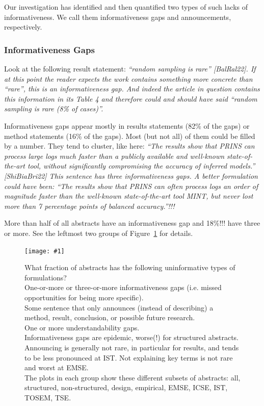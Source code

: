 \documentclass[10pt,journal,compsoc]{IEEEtran}
\newcommand{\Plotwide}[2]{%
	\begin{figure}[tbp]%
		\centering\texttt{[image: \#1]}%
		\vspace{-4mm}\caption{#2}\label{#1}%
    \end{figure}}
\newcommand{\Art}[1]{\bgroup[#1]\egroup} %
\newcommand{\Quote}[1]{\bgroup\itshape ``#1''\egroup}  %
\newcommand{\Pseudoquote}[1]{\bgroup\itshape ``#1''\egroup}  %
\newcommand{\Describegroups}{The plots in each group show these different subsets of abstracts:
	all, structured, non-structured, design, empirical, EMSE, ICSE, IST, TOSEM, TSE.}
\begin{document}
Our investigation has identified and then quantified two types
of such lacks of informativeness.
We call them informativeness gaps and announcements, respectively.

\subsubsection{Informativeness Gaps}\label{igaps}

Look at the following result statement:
\Quote{random sampling is rare} \Art{BalRal22}. %
If at this point the reader expects the work contains something more
concrete than \Quote{rare}, this is an informativeness gap.
And indeed the article in question contains this information in its
Table 4 and therefore could and should have said
\Pseudoquote{random sampling is rare (8\% of cases)}.

Informativeness gaps appear mostly in results statements (82\% of the gaps)
or method statements (16\% of the gaps).
Most (but not all) of them could be filled by a number.
They tend to cluster,
like here:
\Quote{The results show that PRINS can process large logs much faster
  than a publicly available and well-known state-of-the-art tool,
  without significantly compromising the accuracy of inferred models.} \Art{ShiBiaBri22} %
This sentence has three informativeness gaps.
A better formulation could have been:
\Pseudoquote{The results show that PRINS can often process logs an order of magnitude faster
  than the well-known state-of-the-art tool MINT,
  but never lost more than 7 percentage points of balanced accuracy.}!!!

More than half of all abstracts have an informativeness gap
and 18\%!!! have three or more.
See the leftmost two groups of Figure~\ref{nonzerofractionbar_xletgroups_missinginfofractions}
for details.

\Plotwide{nonzerofractionbar_xletgroups_missinginfofractions}{%
	What fraction of abstracts has the following uninformative types of formulations?\\
	One-or-more or three-or-more informativeness gaps (i.e. missed opportunities for being more specific).\\
	Some sentence that only announces (instead of describing) a method, result, conclusion, or
	possible future research.\\
	One or more understandability gaps.\\
	Informativeness gaps are epidemic, worse(!) for structured abstracts.
	Announcing is generally not rare, in particular for results, and tends to be less pronounced
	at IST.
	Not explaining key terms is not rare and worst at EMSE.\\
	\Describegroups}
\end{document}
